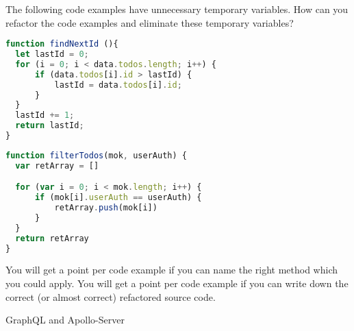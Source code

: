 \documentclass[addpoints]{exam}
\begin{document}
\begin{questions}
\begin{parts}
The following code examples have unnecessary temporary variables. How can you
refactor the code examples and eliminate these temporary variables?
\begin{lstlisting}[extendedchars=true,basicstyle=\footnotesize\ttfamily,language=JavaScript]
function findNextId (){
  let lastId = 0;
  for (i = 0; i < data.todos.length; i++) {
      if (data.todos[i].id > lastId) {
          lastId = data.todos[i].id;
      }
  }
  lastId += 1;
  return lastId;
}
\end{lstlisting}
\makeemptybox{12em}

\begin{lstlisting}[extendedchars=true,basicstyle=\footnotesize\ttfamily,language=JavaScript]
function filterTodos(mok, userAuth) {
  var retArray = []

  for (var i = 0; i < mok.length; i++) {
      if (mok[i].userAuth == userAuth) {
          retArray.push(mok[i])
      }
  }
  return retArray
}
\end{lstlisting}
\makeemptybox{12em}


\begin{subparts}
  \subpart[3]
  You will get a point per code example if you can name the right method which
  you could apply.
  \subpart[3]
  You will get a point per code example if you can write down the correct (or
  almost correct) refactored source code.
\end{subparts}
\end{parts}


\clearpage
\question GraphQL and Apollo-Server

\end{questions}
\end{document}
